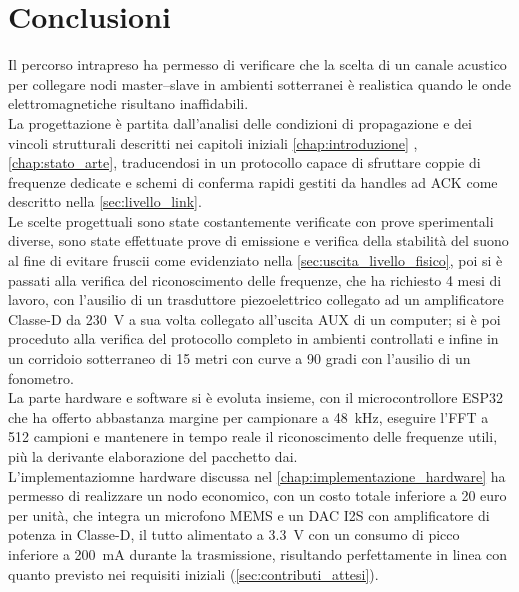 \chapter{Conclusioni}
Il percorso intrapreso ha permesso di verificare che la scelta di un canale acustico per collegare nodi master--slave in ambienti sotterranei 
è realistica quando le onde elettromagnetiche risultano inaffidabili.\\
La progettazione è partita dall'analisi delle condizioni di propagazione 
e dei vincoli strutturali descritti nei capitoli iniziali \autoref{chap:introduzione} , \autoref{chap:stato_arte}, 
traducendosi in un protocollo capace di sfruttare coppie di frequenze dedicate e schemi
 di conferma rapidi gestiti da handles ad ACK come descritto nella \autoref{sec:livello_link}.\\
Le scelte progettuali sono state costantemente verificate con prove sperimentali diverse, sono state effettuate prove di emissione e verifica della 
stabilità del suono al fine di evitare fruscii come evidenziato nella \autoref{sec:uscita_livello_fisico}, 
poi si è passati alla verifica del riconoscimento delle frequenze, che ha richiesto 4 mesi di lavoro, con l'ausilio di un trasduttore 
piezoelettrico collegato ad un amplificatore Classe-D da \SI{230}{\volt} a sua volta collegato all'uscita AUX di un computer;
 si è poi proceduto alla verifica del protocollo completo in ambienti controllati e infine in un corridoio sotterraneo di 
15 metri con curve a 90 gradi con l'ausilio di un fonometro.\\

La parte hardware e software si è evoluta insieme, con il microcontrollore ESP32 che ha offerto abbastanza margine per campionare a 
\SI{48}{\kilo\hertz}, eseguire l'FFT a 512 campioni e mantenere in tempo reale il riconoscimento delle frequenze utili, più la derivante elaborazione 
del pacchetto dai.\\
L'implementaziomne hardware discussa nel \autoref{chap:implementazione_hardware} ha permesso di realizzare un nodo economico, con un costo
 totale inferiore a 20 euro per unità, che integra un microfono MEMS e un DAC I2S con amplificatore di potenza in Classe-D,
 il tutto alimentato a \SI{3.3}{\volt} con un consumo di picco inferiore a \SI{200}{\milli\ampere} durante la trasmissione, risultando 
 perfettamente in linea con quanto previsto nei requisiti iniziali (\autoref{sec:contributi_attesi}).\\


